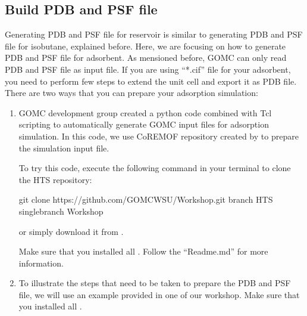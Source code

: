 \documentclass[letterpaper,10pt,english]{sphinxmanual}
\begin{document}
\subsection{Build PDB and PSF file}
\label{\detokenize{howto:build-pdb-and-psf-file}}
\sphinxAtStartPar
Generating PDB and PSF file for reservoir is similar to generating PDB and PSF file for isobutane, explained before. Here, we are focusing on how to generate
PDB and PSF file for adsorbent.
As mensioned before, GOMC can only read PDB and PSF file as input file. If you are using “*.cif” file for your adsorbent, you need to perform few steps
to extend the unit cell and export it as PDB file. There are two ways that you can prepare your adsorption simulation:
\begin{enumerate}
%
\item {} 
\sphinxAtStartPar
{}

\sphinxAtStartPar
GOMC development group created a python code combined with Tcl scripting to automatically generate GOMC input files for adsorption simulation.
In this code, we use CoRE\sphinxhyphen{}MOF repository created by  to prepare the simulation input file.

\sphinxAtStartPar
To try this code, execute the following command in your terminal to clone the HTS repository:

\begin{sphinxVerbatim}[commandchars=\\\{\}]
\PYGZdl{} git  clone    https://github.com/GOMC\PYGZhy{}WSU/Workshop.git \PYGZhy{}\PYGZhy{}branch HTS \PYGZhy{}\PYGZhy{}single\PYGZhy{}branch
\PYGZdl{}    Workshop
\end{sphinxVerbatim}

\sphinxAtStartPar
or simply download it from  .

\sphinxAtStartPar
Make sure that you installed all . Follow the
“Readme.md” for more information.

\item {} 
\sphinxAtStartPar
{}

\sphinxAtStartPar
To illustrate the steps that need to be taken to prepare the PDB and PSF file, we will use an example provided in one of our workshop. Make sure that you
installed all .


\end{enumerate}
\end{document}
